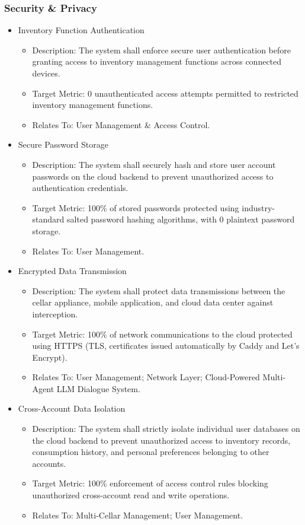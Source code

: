 \documentclass[conference]{IEEEtran}
\begin{document}
\subsubsection{Security \& Privacy}
\begin{itemize}
    \item Inventory Function Authentication
    \begin{itemize}
        \item Description: The system shall enforce secure user authentication before granting access to inventory management functions across connected devices.
        \item Target Metric: 0 unauthenticated access attempts permitted to restricted inventory management functions.
        \item Relates To: User Management \& Access Control.
    \end{itemize}

    \item Secure Password Storage
    \begin{itemize}
        \item Description: The system shall securely hash and store user account passwords on the cloud backend to prevent unauthorized access to authentication credentials.
        \item Target Metric: 100\% of stored passwords protected using industry-standard salted password hashing algorithms, with 0 plaintext password storage.
        \item Relates To: User Management.
    \end{itemize}

    \item Encrypted Data Transmission
    \begin{itemize}
        \item Description: The system shall protect data transmissions between the cellar appliance, mobile application, and cloud data center against interception.
        \item Target Metric: 100\% of network communications to the cloud protected using HTTPS (TLS, certificates issued automatically by Caddy and Let's Encrypt).
        \item Relates To: User Management; Network Layer; Cloud-Powered Multi-Agent LLM Dialogue System.
    \end{itemize}

    \item Cross-Account Data Isolation
    \begin{itemize}
        \item Description: The system shall strictly isolate individual user databases on the cloud backend to prevent unauthorized access to inventory records, consumption history, and personal preferences belonging to other accounts.
        \item Target Metric: 100\% enforcement of access control rules blocking unauthorized cross-account read and write operations.
        \item Relates To: Multi-Cellar Management; User Management.
    \end{itemize}


\end{itemize}
\end{document}
